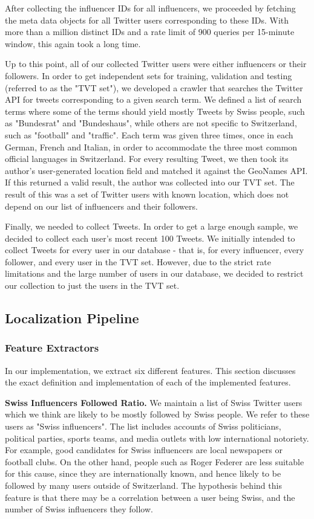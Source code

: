 \documentclass[10pt,a4paper]{article}
\begin{document}
After collecting the influencer IDs for all influencers, we proceeded by fetching the meta data objects for all Twitter users corresponding to these IDs. With more than a million distinct IDs and a rate limit of 900 queries per 15-minute window, this again took a long time.

Up to this point, all of our collected Twitter users were either influencers or their followers. In order to get independent sets for training, validation and testing (referred to as the "TVT set"), we developed a crawler that searches the Twitter API for tweets corresponding to a given search term. We defined a list of search terms where some of the terms should yield mostly Tweets by Swiss people, such as "Bundesrat" and "Bundeshaus", while others are not specific to Switzerland, such as "football" and "traffic". Each term was given three times, once in each German, French and Italian, in order to accommodate the three most common official languages in Switzerland. For every resulting Tweet, we then took its author's user-generated location field and matched it against the GeoNames API. If this returned a valid result, the author was collected into our TVT set. The result of this was a set of Twitter users with known location, which does not depend on our list of influencers and their followers.

Finally, we needed to collect Tweets. In order to get a large enough sample, we decided to collect each user's most recent 100 Tweets. We initially intended to collect Tweets for every user in our database - that is, for every influencer, every follower, and every user in the TVT set. However, due to the strict rate limitations and the large number of users in our database, we decided to restrict our collection to just the users in the TVT set.

\subsection{Localization Pipeline}
\subsubsection{Feature Extractors}
In our implementation, we extract six different features. This section discusses the exact definition and implementation of each of the implemented features.

\textbf{Swiss Influencers Followed Ratio.} We maintain a list of Swiss Twitter users which we think are likely to be mostly followed by Swiss people. We refer to these users as "Swiss influencers". The list includes accounts of Swiss politicians, political parties, sports teams, and media outlets with low international notoriety. For example, good candidates for Swiss influencers are local newspapers or football clubs. On the other hand, people such as Roger Federer are less suitable for this cause, since they are internationally known, and hence likely to be followed by many users outside of Switzerland. The hypothesis behind this feature is that there may be a correlation between a user being Swiss, and the number of Swiss influencers they follow.
\end{document}
